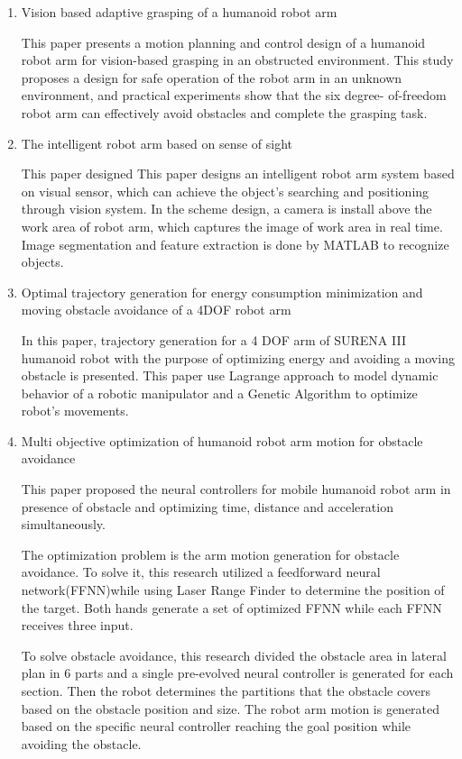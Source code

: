 \documentclass[paper=a4, fontsize=11pt]{scrartcl} %
\numberwithin{equation}{section} %
\numberwithin{figure}{section} %
\numberwithin{table}{section} %
\begin{document}
\begin{enumerate}
\item Vision\- based adaptive grasping of a humanoid robot arm

This paper presents a motion planning and control design of a humanoid robot arm for vision-based grasping in an obstructed environment. This study proposes a design for safe operation of the robot arm in an unknown environment, and practical experiments show that the six degree- of-freedom robot arm can effectively avoid obstacles and complete the grasping task.

\item The intelligent robot arm based on sense of sight

This paper designed This paper designs an intelligent robot arm system based on visual sensor,  which can achieve the object's searching and positioning through vision system. In the scheme design, a camera is install above the work area of robot arm, which captures the image of work area in real time. Image segmentation and feature extraction is done by MATLAB to recognize objects. 

\item Optimal trajectory generation for energy consumption minimization and moving obstacle avoidance of a 4DOF robot arm

In this paper, trajectory generation for a 4 DOF arm of SURENA III humanoid robot with the purpose of optimizing energy and avoiding a moving obstacle is presented. This paper use Lagrange approach to model dynamic behavior of a robotic manipulator and a Genetic Algorithm to optimize robot's movements.

\item Multi objective optimization of humanoid robot arm motion for obstacle avoidance

This paper proposed the neural controllers for mobile humanoid robot arm in presence of obstacle and optimizing time, distance and acceleration simultaneously.

The optimization problem is the arm motion generation for obstacle avoidance. To solve it, this research utilized a feedforward neural network(FFNN)while using Laser Range Finder to determine the position of the target. Both hands generate a set of optimized FFNN while each FFNN receives three input.

To solve obstacle avoidance, this research divided the obstacle area in lateral plan in 6 parts and a single pre-evolved neural controller is generated for each section. Then the robot determines the partitions that the obstacle covers based on the obstacle position and size. The robot arm motion is generated based on the specific neural controller reaching the goal position while avoiding the obstacle. 


\end{enumerate}
\end{document}
